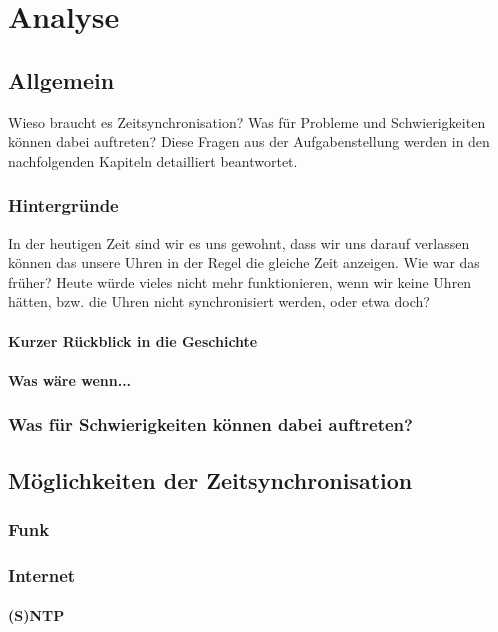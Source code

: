 
\chapter{Analyse}

\section{Allgemein}
Wieso braucht es Zeitsynchronisation? Was für Probleme und Schwierigkeiten können dabei auftreten? Diese Fragen aus der Aufgabenstellung werden in den nachfolgenden Kapiteln detailliert beantwortet.

\subsection{Hintergründe}
In der heutigen Zeit sind wir es uns gewohnt, dass wir uns darauf verlassen können das unsere Uhren in der Regel die gleiche Zeit anzeigen. 
Wie war das früher? Heute würde vieles nicht mehr funktionieren, wenn wir keine Uhren hätten, bzw. die Uhren nicht synchronisiert werden, oder etwa doch?

\subsubsection{Kurzer Rückblick in die Geschichte}

\subsubsection{Was wäre wenn...}

\subsection{Was für Schwierigkeiten können dabei auftreten?}

\section{Möglichkeiten der Zeitsynchronisation}
\subsection{Funk}

\subsection{Internet}
\subsubsection{(S)NTP}